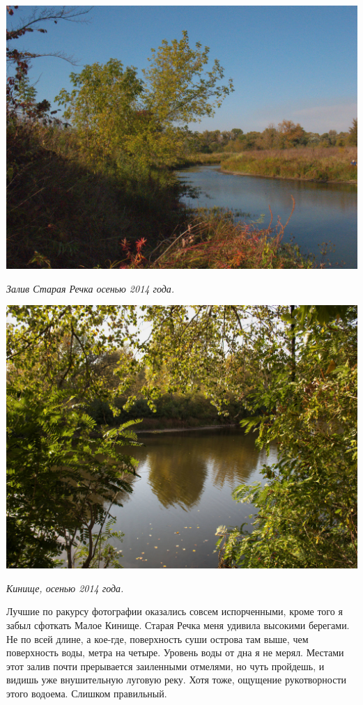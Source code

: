 \begin{center}
\includegraphics[width=0.80\linewidth]{chast-gorodki/cherto/star-rechka-CRW_4023.jpg}

\textit{Залив Старая Речка осенью 2014 года.} 
\end{center}

\begin{center}
\includegraphics[width=0.80\linewidth]{chast-gorodki/cherto/kin-CRW_4003.jpg}

\textit{Кинище, осенью 2014 года.} 
\end{center}

\newpage

Лучшие по ракурсу фотографии оказались совсем испорченными, кроме того я забыл сфоткать Малое Кинище. Старая Речка меня удивила высокими берегами. Не по всей длине, а кое-где, поверхность суши острова там выше, чем поверхность воды, метра на четыре. Уровень воды от дна я не мерял. Местами этот залив почти прерывается заиленными отмелями, но чуть пройдешь, и видишь уже внушительную луговую реку. Хотя тоже, ощущение рукотворности этого водоема. Слишком правильный.

